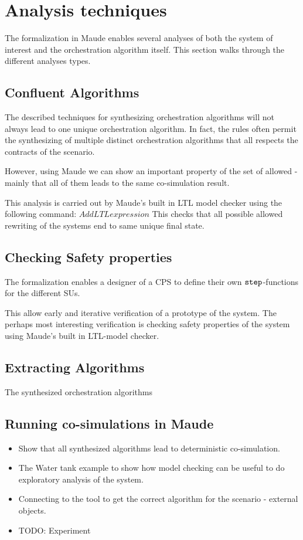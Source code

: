 \section{Analysis techniques}\label{sc:casestudy}

The formalization in Maude enables several analyses of both the system of interest and the orchestration algorithm itself. 
This section walks through the different analyses types.

\subsection{Confluent Algorithms}
The described techniques for synthesizing orchestration algorithms will not always lead to one unique orchestration algorithm.
In fact, the rules often permit the synthesizing of multiple distinct orchestration algorithms that all respects the contracts of the scenario.

However, using Maude we can show an important property of the set of allowed - mainly that all of them leads to the same co-simulation result.

This analysis is carried out by Maude's built in LTL model checker using the following command:
$Add LTL expression$
This checks that all possible allowed rewriting of the systems end to same unique final state.

\subsection{Checking Safety properties}
The formalization enables a designer of a CPS to define their own $\mathtt{step}_{}$-functions for the different SUs.  

This allow early and iterative verification of a prototype of the system. 
The perhaps most interesting verification is checking safety properties of the system using Maude's built in LTL-model checker. 


\subsection{Extracting Algorithms}
The synthesized orchestration algorithms 

\subsection{Running co-simulations in Maude}

\begin{itemize}
  \item Show that all synthesized algorithms lead to deterministic co-simulation.
  \item The Water tank example to show how model checking can be useful to do exploratory analysis of the system.
  \item Connecting to the tool to get the correct algorithm for the scenario - external objects.
  \item TODO: Experiment
\end{itemize}
